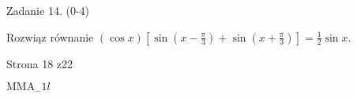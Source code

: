 \documentclass[a4paper,12pt]{article}
\begin{document}
Zadanie 14. (0-4)

Rozwiąz równanie $(\displaystyle \cos x)[\sin(x-\frac{\pi}{3})+\sin(x+\frac{\pi}{3})]=\frac{1}{2}\sin x.$

Strona 18 z22

$\mathrm{M}\mathrm{M}\mathrm{A}_{-}1l$
\end{document}
